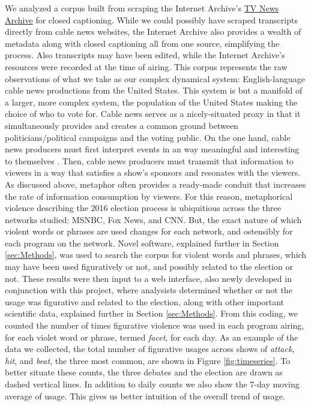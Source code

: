 We analyzed a corpus built from scraping the Internet Archive's 
\href{http://archive.org/tv/details}{TV News Archive} for closed captioning.
While we could possibly have scraped transcripts directly from cable news
websites, the Internet Archive also provides a wealth of metadata along with
closed captioning all from one source, simplifying the process. Also transcripts
may have been edited, while the Internet Archive's resources were recorded
at the time of airing. This corpus represents the raw observations of what we
take as our complex dynamical system: English-language cable news productions
from the United States. This system is but a manifold of a larger, 
more complex system,
the population of the United States making the choice of who to vote for. 
Cable news serves as
a nicely-situated proxy in that it simultaneously provides and creates
a common ground between politicians/political campaigns and the voting public.
On the one hand, cable news producers must first 
interpret events in an way meaningful and interesting to themselves \cite{Clark1996}. 
Then, cable news producers must transmit that information to viewers in a
way that satisfies a show's sponsors and resonates
with the viewers. As discussed above, metaphor often provides
a ready-made conduit that increases the rate of information consumption by
viewers. For this reason, metaphorical violence describing the 2016 election
process is ubiquitious across the three networks studied: MSNBC, Fox News, and
CNN. But, the exact nature of which violent words or phrases are used changes
for each network, and ostensibly for each program on the network. Novel 
software, explained further in Section \ref{sec:Methods}, 
was used to search the corpus for violent words and phrases, which may have been
used figuratively or not, and possibly related to the election or not.
These results were then input to a web interface, also newly developed in 
conjunction with this project, where analysists determined whether or not the
usage was figurative and related to the election, along with other important
scientific data, explained further in Section \ref{sec:Methods}. 
From this coding, we counted the number of times figurative violence was 
used in each program airing, for each violet word or phrase, termed 
\textit{facet}, for each day. As an example of the data we collected, the 
total number of figurative usages across shows of \textit{attack}, \textit{hit}, and
\textit{beat}, the three most common, are shown in Figure \ref{fig:timeseries}. 
To better situate these counts, the three debates and the election are drawn
as dashed vertical lines. In addition to daily counts we also show the 7-day
moving average of usage. This gives us better intuition of the overall trend
of usage.

